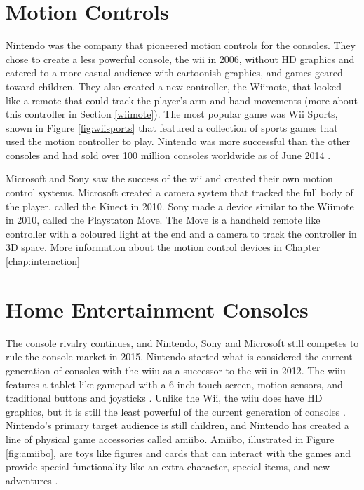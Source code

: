 
\section{Motion Controls}
Nintendo was the company that pioneered motion controls for the consoles. They chose to create a less powerful console, the \gls{wii} in 2006, without HD graphics and catered to a more casual audience with cartoonish graphics, and games geared toward children. They also created a new controller, the Wiimote, that looked like a remote that could track the player's arm and hand movements (more about this controller in Section \ref{wiimote}). The most popular game was Wii Sports, shown in Figure \ref{fig:wiisports} that featured a collection of sports games that used the motion controller to play. Nintendo was more successful than the other consoles and had sold over 100 million consoles worldwide as of June 2014 \cite{2014nintendo}.

Microsoft and Sony saw the success of the \gls{wii} and created their own motion control systems. Microsoft created a camera system that tracked the full body of the player, called the Kinect in 2010. Sony made a device similar to the Wiimote in 2010, called the Playstaton Move. The Move is a handheld remote like controller with a coloured light at the end and a camera to track the controller in 3D space. More information about the motion control devices in Chapter \ref{chap:interaction}

\section{Home Entertainment Consoles}
The console rivalry continues, and Nintendo, Sony and Microsoft still competes to rule the console market in 2015.
Nintendo started what is considered the current generation of consoles with the \gls{wiiu} as a successor to the \gls{wii} in 2012. The \gls{wiiu} features a tablet like gamepad with a 6 inch touch screen, motion sensors, and traditional buttons and joysticks \cite{2015wiiu}. Unlike the Wii, the \gls{wiiu} does have HD graphics, but it is still the least powerful of the current generation of consoles \cite{2015ign}. Nintendo's primary target audience is still children, and Nintendo has created a line of physical game accessories called amiibo. Amiibo, illustrated in Figure \ref{fig:amiibo}, are toys like figures and cards that can interact with the games and provide special functionality like an extra character, special items, and new adventures \cite{2015amiibo}. 

